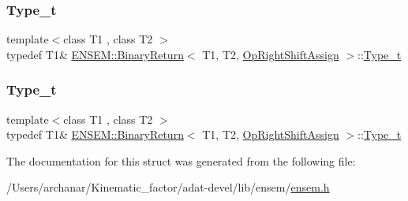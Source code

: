 \mbox{\label{structENSEM_1_1BinaryReturn_3_01T1_00_01T2_00_01OpRightShiftAssign_01_4_a26258e35d38645434ce665a2ece52c32}} 
\subsubsection{\texorpdfstring{Type\_t}{Type\_t}\hspace{0.1cm}{\footnotesize\ttfamily [2/3]}}
{\footnotesize\ttfamily template$<$class T1 , class T2 $>$ \\
typedef T1\& \mbox{\hyperlink{structENSEM_1_1BinaryReturn}{E\+N\+S\+E\+M\+::\+Binary\+Return}}$<$ T1, T2, \mbox{\hyperlink{structENSEM_1_1OpRightShiftAssign}{Op\+Right\+Shift\+Assign}} $>$\+::\mbox{\hyperlink{structENSEM_1_1BinaryReturn_3_01T1_00_01T2_00_01OpRightShiftAssign_01_4_a26258e35d38645434ce665a2ece52c32}{Type\+\_\+t}}}

\mbox{\label{structENSEM_1_1BinaryReturn_3_01T1_00_01T2_00_01OpRightShiftAssign_01_4_a26258e35d38645434ce665a2ece52c32}} 
\subsubsection{\texorpdfstring{Type\_t}{Type\_t}\hspace{0.1cm}{\footnotesize\ttfamily [3/3]}}
{\footnotesize\ttfamily template$<$class T1 , class T2 $>$ \\
typedef T1\& \mbox{\hyperlink{structENSEM_1_1BinaryReturn}{E\+N\+S\+E\+M\+::\+Binary\+Return}}$<$ T1, T2, \mbox{\hyperlink{structENSEM_1_1OpRightShiftAssign}{Op\+Right\+Shift\+Assign}} $>$\+::\mbox{\hyperlink{structENSEM_1_1BinaryReturn_3_01T1_00_01T2_00_01OpRightShiftAssign_01_4_a26258e35d38645434ce665a2ece52c32}{Type\+\_\+t}}}



The documentation for this struct was generated from the following file\+:\begin{DoxyCompactItemize}
\item 
/\+Users/archanar/\+Kinematic\+\_\+factor/adat-\/devel/lib/ensem/\mbox{\hyperlink{adat-devel_2lib_2ensem_2ensem_8h}{ensem.\+h}}\end{DoxyCompactItemize}
